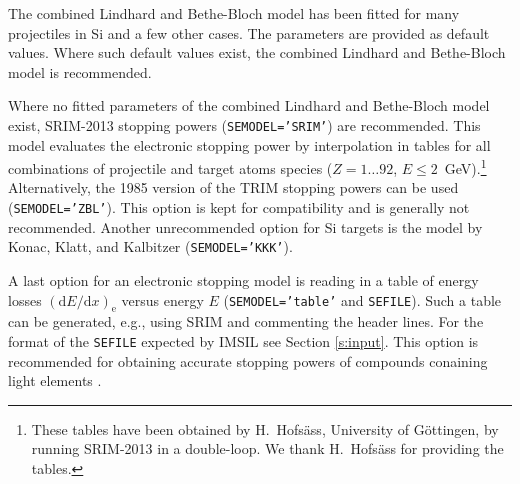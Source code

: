 The combined Lindhard and Bethe-Bloch model has been fitted for many 
projectiles in Si \cite{I0104} and a few other cases. The parameters are
provided as default values. Where such default values exist, the
combined Lindhard and Bethe-Bloch model is recommended.

Where no fitted parameters of the combined Lindhard and Bethe-Bloch model
exist, SRIM-2013 \cite{SRIM} stopping powers (\texttt{SEMODEL='SRIM'}) 
are recommended. This model evaluates the electronic stopping power by 
interpolation in tables for all combinations of projectile and target 
atoms species ($Z = 1 \ldots 92$, $E \le 2$~GeV).\footnote{These tables 
have been obtained by H.\ Hofsäss, University of Göttingen, by running 
SRIM-2013 in a double-loop. We thank H.\ Hofsäss for providing the tables.}
Alternatively, the 1985 version of the TRIM stopping powers \cite{I8512} 
can be used (\texttt{SEMODEL='ZBL'}). This option is kept for compatibility
and is generally not recommended. Another unrecommended option for Si targets
is the model by Konac, Klatt, and Kalbitzer \cite{I9848} 
(\texttt{SEMODEL='KKK'}).

A last option for an electronic stopping model is reading in a table of 
energy losses $(\mathrm{d}E/\mathrm{d}x)_\mathrm{e}$ versus energy $E$ 
(\texttt{SEMODEL='table'} and \texttt{SEFILE}). Such a table can be generated,
e.g., using SRIM \cite{SRIM} and commenting the header lines. For the format 
of the \texttt{SEFILE} expected by IMSIL see Section \ref{s:input}. This option 
is recommended for obtaining accurate stopping powers of compounds conaining 
light elements \cite{ziegler_srim_2010}.

